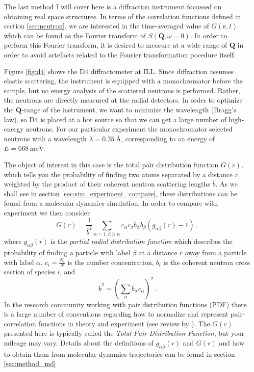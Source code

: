 The last method I will cover here is a diffraction instrument focussed on obtaining real space structures. In terms of the correlation functions defined in section \ref{sec:neutron}, we are interested in the time-averaged value of $G(\bm{r}, t)$ which can be found as the Fourier transform of $S(\bm{Q},\omega=0)$. In order to perform this Fourier transform, it is desired to measure at a wide range of $\bm{Q}$ in order to avoid artefacts related to the Fourier transformation pocedure itself.

Figure \ref{fig:d4} shows the D4 diffractometer at ILL. Since diffraction assumes elastic scattering, the instrument is equipped with a monochromator before the sample, but no energy analysis of the scattered neutrons is performed. Rather, the neutrons are directly measured at the radial detectors. In order to optimize the $\bm{Q}$-range of the instrument, we want to minimize the wavelength (Bragg's law), so D4 is placed at a hot source so that we can get a large number of high-energy neutrons. For our particular experiment the monochromator selected neutrons with a wavelength $\lambda = \SI{0.35}{\angstrom}$, corresponding to an energy of $E = \SI{668}{\milli\eV}$.

The object of interest in this case is the total pair distribution function $G(r)$, which tells you the probability of finding two atoms separated by a distance $r$, weighted by the product of their coherent neutron scattering lengths $\overline{b}$. As we shall see in section \ref{sec:sim_experiment_compare}, these distributions can be found from a molecular dynamics simulation. In order to compare with experiment  we then consider
%
\[ G(r) = \frac{1}{\overline{b}^2} \sum_{\alpha=1,\beta\geq\alpha} c_\alpha c_\beta \overline{b}_\alpha \overline{b}_\beta (g_{\alpha\beta}(r) - 1) \, , \]
%
where $g_{\alpha\beta}(r)$ is the \emph{partial radial distribution function} which describes the probability of finding a particle with label $\beta$ at a distance $r$ away from a particle with label $\alpha$. $c_i = \frac{N_i}{N}$ is the number concentration, $\bar{b_i}$ is the coherent neutron cross section of species $i$,  and 
%
\[ \overline{b}^2 = \left(\sum_\alpha \overline{b}_\alpha c_\alpha \right)^2 \, . \]
In the research community working with pair distribution functions (PDF) there is a large number of conventions regarding how to normalize and represent pair-correlation functions in theory and experiment (see review by \citeauthor{Keen2001} \cite{Keen2001}). The $G(r)$ presented here is typically called the \emph{Total Pair-Distribution Function}, but your mileage may vary. Details about the definitions of $g_{\alpha\beta}(r)$ and $G(r)$ and how to obtain them from molecular dynamics trajectories can be found in section \ref{sec:method_md}

